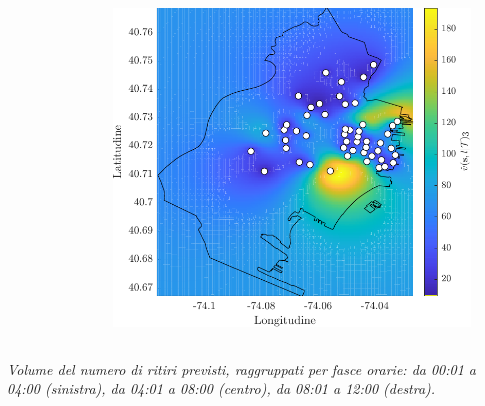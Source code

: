 \begin{frame}
\begin{columns}
\begin{column}{0.33\linewidth}
\begin{figure}
			\end{figure}
		\end{column}
		\begin{column}{0.33\linewidth}
			\centering
			\begin{figure}
				\includegraphics[width=\textwidth]{../Tesi/Immagini/4. Caso di studio/Kriging/Mappa volume, 3}
			\end{figure}
		\end{column}
	\end{columns}
	\textit{Volume del numero di ritiri previsti, raggruppati per fasce orarie: da 00:01 a 04:00 (sinistra), da 04:01 a 08:00 (centro), da 08:01 a 12:00 (destra).}
\end{frame}

